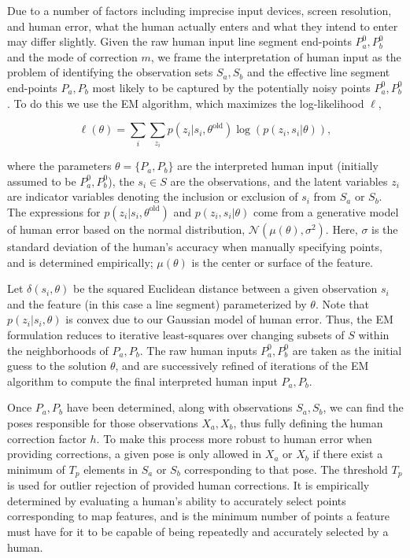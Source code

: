 \documentclass[letterpaper]{article} %
\theoremstyle{definition}
\begin{document}
Due to a number of factors including imprecise input devices, screen
resolution, and human error, what the human actually enters and what they
intend to enter may differ slightly. Given the raw human input line segment
end-points $P_a ^0,P_b ^0$ and the mode of correction $m$, we frame the
interpretation of human input as the problem of identifying the observation
sets $S_a, S_b$ and the effective line segment end-points $P_a, P_b$ most
likely to be captured by the potentially noisy points $P_a ^0,P_b ^0$.
To do this we use the EM algorithm, which maximizes the
log-likelihood $\ell$,

\begin{equation*}
\ell(\theta) = \sum_i \sum_{z_i} p(z_i | s_i , \theta^{\text{old}}) \log(p(z_i , s_i | \theta )),
\end{equation*}

\noindent where the parameters $\theta = \{ P_a, P_b \}$ are the
interpreted human input (initially assumed to be  $P_a ^0,P_b ^0$), the $s_i
\in S$ are the observations, and the latent variables $z_i$ are indicator
variables denoting the inclusion or exclusion of $s_i$ from $S_a$ or $S_b$. The
expressions for $p(z_i | s_i , \theta^{\text{old}})$ and $p(z_i , s_i | \theta
)$ come from a generative model of human error based on the normal
distribution, $\mathcal{N}(\mu(\theta), \sigma^2)$. Here, $\sigma$ is the
standard deviation of the human's accuracy when manually specifying points, and
is determined empirically; $\mu(\theta)$ is the center or surface of the
feature.

Let $\delta(s_i, \theta)$ be the squared Euclidean distance between a given
observation $s_i$ and the feature (in this case a line segment) parameterized by
$\theta$. Note that $p(z_i | s_i, \theta)$ is convex due to our Gaussian model
of human error. Thus, the EM formulation reduces to iterative least-squares over
changing subsets of $S$ within the neighborhoods of $P_a, P_b$. The raw human
inputs $P_a ^0,P_b ^0$ are taken as the initial guess to the solution $\theta$,
and are successively refined of iterations of the EM algorithm to compute the
final interpreted human input  $P_a,P_b$.

Once $P_a, P_b$ have been determined, along with observations $S_a, S_b$, we can
find the poses responsible for those observations $X_a, X_b$, thus fully
defining the human correction factor $h$. To make this process more robust to
human error when providing corrections, a given pose is only allowed in $X_a$ or
$X_b$ if there exist a minimum of $T_p$ elements in $S_a$ or $S_b$ corresponding
to that pose. The threshold $T_p$ is used for outlier rejection of provided
human corrections. It is empirically determined by evaluating a human's ability
to accurately select points corresponding to map features, and is the minimum
number of points a feature must have for it to be capable of being repeatedly
and accurately selected by a human.
\end{document}
